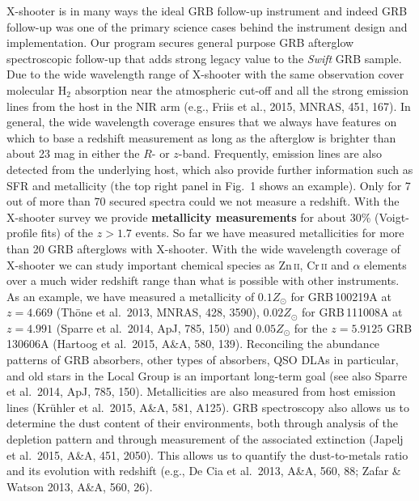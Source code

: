 \documentclass[iop, twocolappendix, numberedappendix, tighten, appendixfloats]{emulateapj}
\begin{document}
	
	\smallskip
	
	X-shooter is in many ways
	the ideal GRB follow-up instrument and indeed GRB follow-up was one of the
	primary science cases behind the instrument design and implementation. Our
	program secures general purpose GRB afterglow spectroscopic follow-up 
	that adds strong legacy value to the \textit{Swift} GRB sample.
	Due to the wide wavelength range of X-shooter  
	with the same observation cover molecular H$_2$ absorption near the
	atmospheric cut-off and all the strong emission lines from the host in the
	NIR arm (e.g., Friis et al., 2015, MNRAS, 451, 167). In general, the wide wavelength coverage ensures that we always have
	features on which to base a redshift measurement as long as the afterglow is
	brighter than about 23 mag in either the $R$- or $z$-band. 
	Frequently, emission lines are also detected from the underlying host, which
	also provide further information such as SFR and metallicity (the top right 
	panel in Fig.~1 shows an example). Only for 
	7 out of more than 70 secured spectra could we not measure a redshift.   
	With the X-shooter survey we
	provide {\bf metallicity measurements} for about 30\% (Voigt-profile fits)
	of the $z>1.7$ events.
	So far we have
	measured metallicities for more than 20 GRB afterglows with X-shooter.
	With the wide wavelength coverage of X-shooter we can
	study important chemical species as Zn\,\textsc{ii}, Cr\,\textsc{ii} and $\alpha$
	elements over a much wider redshift range than what is possible with other
	instruments.
	As an example, we have measured a metallicity of $0.1 Z_\odot$ for GRB\,100219A
	at $z=4.669$ (Th{\"o}ne et al.\ 2013, MNRAS, 428, 3590), $0.02Z_\odot$ for 
	GRB\,111008A at $z=4.991$ (Sparre et al.\ 2014, ApJ, 785, 150) and $0.05Z_\odot$
	for the $z=5.9125$ GRB\,130606A (Hartoog et al.\ 2015, A\&A, 580, 139).  
	Reconciling the
	abundance patterns of GRB absorbers, other types of absorbers, QSO DLAs
	in particular, and old stars in the Local Group is an important long-term
	goal (see also Sparre et al.\ 2014, ApJ, 785, 150).
	Metallicities are also measured from host emission lines (Kr{\"u}hler et al.\ 2015,
	A\&A, 581, A125).
	GRB spectroscopy also allows us to determine the dust content of their environments,
	both through analysis of the depletion pattern and through measurement of the
	associated extinction (Japelj et al.\ 2015, A\&A, 451, 2050). 
	This allows us to quantify the dust-to-metals ratio and its
	evolution with redshift (e.g., De Cia et al.\ 2013, A\&A, 560, 88; Zafar \&
	Watson 2013, A\&A, 560, 26).
	
\end{document}

